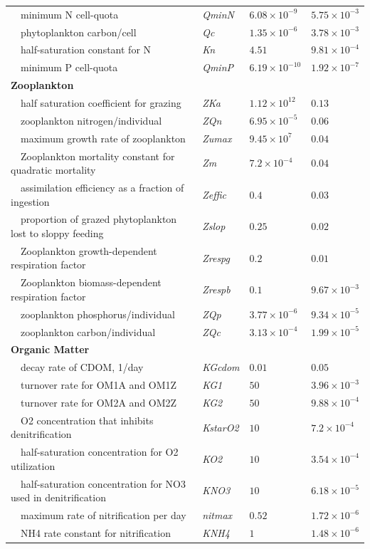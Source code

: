 \documentclass[review]{elsarticle}\usepackage[]{graphicx}\usepackage[]{color}
\begin{document}
\begin{table}[!tbp]
{\begin{center}
\begin{tabular}{llll}
~~minimum N cell-quota&\textit{QminN}&$6.08\times 10^{-9}$&$5.75\times 10^{-3}$\tabularnewline
~~phytoplankton carbon/cell&\textit{Qc}&$1.35\times 10^{-6}$&$3.78\times 10^{-3}$\tabularnewline
~~half-saturation constant for N&\textit{Kn}&$4.51$&$9.81\times 10^{-4}$\tabularnewline
~~minimum P cell-quota&\textit{QminP}&$6.19\times 10^{-10}$&$1.92\times 10^{-7}$\tabularnewline
\hline
{\bfseries Zooplankton}&&&\tabularnewline
~~half saturation coefficient for grazing&\textit{ZKa}&$1.12\times 10^{12}$&$0.13$\tabularnewline
~~zooplankton nitrogen/individual&\textit{ZQn}&$6.95\times 10^{-5}$&$0.06$\tabularnewline
~~maximum growth rate of zooplankton&\textit{Zumax}&$9.45\times 10^{7}$&$0.04$\tabularnewline
~~Zooplankton mortality constant for quadratic mortality&\textit{Zm}&$7.2\times 10^{-4}$&$0.04$\tabularnewline
~~assimilation efficiency as a fraction of ingestion&\textit{Zeffic}&$0.4$&$0.03$\tabularnewline
~~proportion of grazed phytoplankton lost to sloppy feeding&\textit{Zslop}&$0.25$&$0.02$\tabularnewline
~~Zooplankton growth-dependent respiration factor&\textit{Zrespg}&$0.2$&$0.01$\tabularnewline
~~Zooplankton biomass-dependent respiration factor&\textit{Zrespb}&$0.1$&$9.67\times 10^{-3}$\tabularnewline
~~zooplankton phosphorus/individual&\textit{ZQp}&$3.77\times 10^{-6}$&$9.34\times 10^{-5}$\tabularnewline
~~zooplankton carbon/individual&\textit{ZQc}&$3.13\times 10^{-4}$&$1.99\times 10^{-5}$\tabularnewline
\hline
{\bfseries Organic Matter}&&&\tabularnewline
~~decay rate of CDOM, 1/day&\textit{KGcdom}&$0.01$&$0.05$\tabularnewline
~~turnover rate for OM1A and OM1Z&\textit{KG1}&$50$&$3.96\times 10^{-3}$\tabularnewline
~~turnover rate for OM2A and OM2Z&\textit{KG2}&$50$&$9.88\times 10^{-4}$\tabularnewline
~~O2 concentration that inhibits denitrification&\textit{KstarO2}&$10$&$7.2\times 10^{-4}$\tabularnewline
~~half-saturation concentration for O2 utilization&\textit{KO2}&$10$&$3.54\times 10^{-4}$\tabularnewline
~~half-saturation concentration for NO3 used in denitrification&\textit{KNO3}&$10$&$6.18\times 10^{-5}$\tabularnewline
~~maximum rate of nitrification per day&\textit{nitmax}&$0.52$&$1.72\times 10^{-6}$\tabularnewline
~~NH4 rate constant for nitrification&\textit{KNH4}&$1$&$1.48\times 10^{-6}$\tabularnewline
\hline
\end{tabular}\end{center}}
\end{table}
\end{document}
